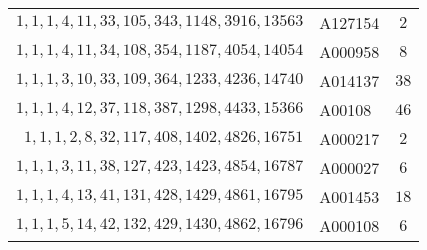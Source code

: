 \begin{longtabu}{|r|l|c|}
    \(1,    1,    1,    4,   11,   33,  105,  343, 1148, 3916, 13563\)  & A127154 &\(2\)\\
    \(1,    1,    1,    4,   11,   34,  108,  354, 1187, 4054, 14054\)  & A000958 &\(8\)\\
    \(1,    1,    1,    3,   10,   33,  109,  364, 1233, 4236, 14740\)  & A014137 &\(38\)\\
    \(1,    1,    1,    4,   12,   37,  118,  387, 1298, 4433, 15366\)  & A00108 &\(46\)\\
    \(1,    1,    1,    2,    8,   32,  117,  408, 1402, 4826, 16751\)  & A000217 &\(2\)\\
    \(1,    1,    1,    3,   11,   38,  127,  423, 1423, 4854, 16787\)  & A000027 &\(6\)\\
    \(1,    1,    1,    4,   13,   41,  131,  428, 1429, 4861, 16795\)  & A001453 &\(18\)\\
    \(1,    1,    1,    5,   14,   42,  132,  429, 1430, 4862, 16796\)  & A000108 &\(6\)\\
    \hline
\end{longtabu}


